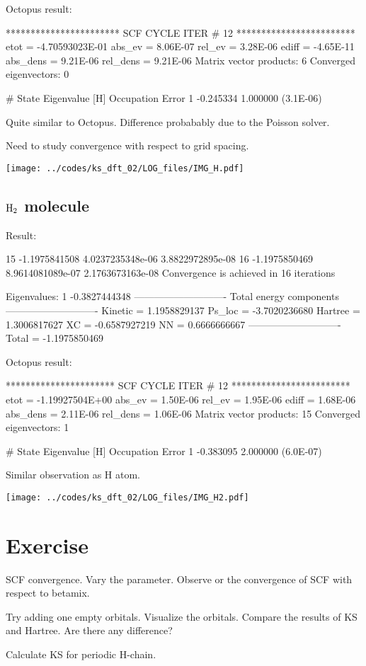 Octopus result:
\begin{textcode}
*********************** SCF CYCLE ITER #   12 ************************
 etot  = -4.70593023E-01 abs_ev   =  8.06E-07 rel_ev   =  3.28E-06
 ediff =       -4.65E-11 abs_dens =  9.21E-06 rel_dens =  9.21E-06
Matrix vector products:      6
Converged eigenvectors:      0
 
 #  State  Eigenvalue [H]  Occupation    Error
       1       -0.245334    1.000000   (3.1E-06)
\end{textcode}

Quite similar to Octopus.
Difference probabably due to the Poisson solver.

Need to study convergence with respect to grid spacing.

{\centering
\texttt{[image: ../codes/ks\_dft\_02/LOG\_files/IMG\_H.pdf]}
}

\subsection{$\ce{H2}$ molecule}

Result:
\begin{textcode}
  15      -1.1975841508   4.0237235348e-06   3.8822972895e-08
  16      -1.1975850469   8.9614081089e-07   2.1763673163e-08
Convergence is achieved in 16 iterations

Eigenvalues:
 1      -0.3827444348
----------------------------
Total energy components
----------------------------
Kinetic =       1.1958829137
Ps_loc  =      -3.7020236680
Hartree =       1.3006817627
XC      =      -0.6587927219
NN      =       0.6666666667
----------------------------
Total   =      -1.1975850469
\end{textcode}

Octopus result:
\begin{textcode}
********************** SCF CYCLE ITER #   12 ************************
 etot  = -1.19927504E+00 abs_ev   =  1.50E-06 rel_ev   =  1.95E-06
 ediff =        1.68E-06 abs_dens =  2.11E-06 rel_dens =  1.06E-06
Matrix vector products:     15
Converged eigenvectors:      1

#  State  Eigenvalue [H]  Occupation    Error
      1       -0.383095    2.000000   (6.0E-07) 
\end{textcode}

Similar observation as H atom.

{\centering
\texttt{[image: ../codes/ks\_dft\_02/LOG\_files/IMG\_H2.pdf]}
}

\section{Exercise}

SCF convergence. Vary the  parameter. Observe or the convergence
of SCF with respect to betamix.

Try adding one empty orbitals. Visualize the orbitals. Compare the results of
KS and Hartree. Are there any difference?

Calculate KS for periodic H-chain.